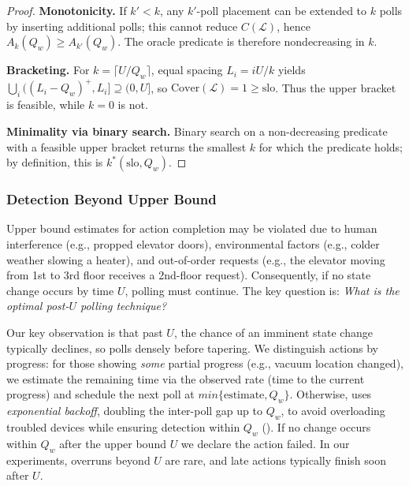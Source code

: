 \begin{proof}
\noindent\textbf{Monotonicity.} If $k'<k$, any $k'$-poll placement can be extended to $k$ polls by inserting additional polls; this cannot reduce $C(\mathcal{L})$, hence $A_k(Q_w)\ge A_{k'}(Q_w)$. The oracle predicate is therefore nondecreasing in $k$.

\noindent\textbf{Bracketing.} For $k=\lceil U/Q_w\rceil$, equal spacing $L_i=iU/k$ yields $\bigcup_i ((L_i-Q_w)^+,L_i]\supseteq(0,U]$, so $\mathrm{Cover}(\mathcal{L})=1\ge \text{slo}$. Thus the upper bracket is feasible, while $k=0$ is not.

\noindent\textbf{Minimality via binary search.} Binary search on a non-decreasing predicate with a feasible upper bracket returns the smallest $k$ for which the predicate holds; by definition, this is $k^*(\text{slo},Q_w)$.
\end{proof}

\subsubsection{Detection Beyond  Upper Bound}
\label{rasc:sec:detect-after-U}

Upper bound estimates for action completion may be violated due to 
human interference (e.g., propped elevator doors), environmental factors (e.g., 
colder weather slowing a heater), and out-of-order requests (e.g., the elevator moving from 1st to 3rd floor receives a 2nd-floor request). 
Consequently,
if no state change occurs by time $U$, polling must continue. 
The key question is: {\it 
What is the optimal post-$U$ polling technique?} 

Our key observation is that past $U$, the chance of an imminent state change typically declines, so \sysname{} polls densely before tapering. 
We distinguish actions by progress:
for those showing {\it some} partial progress (e.g., vacuum location changed), we estimate the remaining time via the observed rate (time to the current progress) and schedule the next poll at $min\{\text{estimate}, Q_w\}$. Otherwise, \sysname{} uses \textit{exponential backoff}, doubling the inter-poll gap up to $Q_w$, to avoid overloading troubled devices while ensuring detection within $Q_w$ ().
If no change occurs within $Q_w$ {after the upper bound $U$} 
we declare the action failed. In our experiments, overruns beyond $U$ are rare, and late actions typically finish soon after $U$. 
